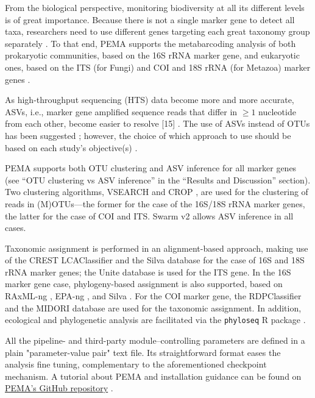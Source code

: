    From the biological perspective, monitoring biodiversity at all its different levels is of great importance. Because there is not a single marker gene to detect all taxa, researchers need to use different genes targeting each great taxonomy group separately \citep{coissac2012bioinformatic}. 
   To that end, PEMA supports the metabarcoding analysis of both prokaryotic communities, based on the 16S rRNA marker gene, and eukaryotic ones, based on the ITS (for Fungi) and COI and 18S rRNA (for Metazoa) marker genes \citep{coissac2012bioinformatic}.
   
   As high-throughput sequencing (HTS) data become more and more accurate, ASVs, i.e., marker gene amplified sequence reads that differ in $≥1$ nucleotide from each other, become easier to resolve [15] \citep{callahan2017exact}. 
   The use of ASVs instead of OTUs has been suggested \citep{callahan2017exact}; 
   however, the choice of which approach to use should be based on each study's objective(s) \citep{pauvert2019bioinformatics}.
   
   PEMA supports both OTU clustering and ASV inference for all marker genes 
   (see “OTU clustering vs ASV inference” in the “Results and Discussion” section). 
   Two clustering algorithms, VSEARCH \citep{rognes2016vsearch} and CROP \citep{hao2011clustering}, are used for the clustering of reads in (M)OTUs—the former for the case of the 16S/18S rRNA marker genes, the latter for the case of COI and ITS. 
   Swarm v2 \citep{mahe2015swarm} allows ASV inference in all cases.
   
   Taxonomic assignment is performed in an alignment-based approach, making use of the CREST LCAClassifier \citep{lanzen2012crest} and the Silva database \citep{quast2012silva} for the case of 16S and 18S rRNA marker genes; 
   the Unite database \citep{rillig2019role} is used for the ITS gene. 
   In the 16S marker gene case, phylogeny-based assignment is also supported, based on RAxML-ng \citep{kozlov2019raxml}, 
   EPA-ng \citep{barbera2019epa}, and Silva \citep{quast2012silva}. 
   For the COI marker gene, the RDPClassifier \citep{wang2007naive} and the MIDORI database \citep{machida2017metazoan} are used for the taxonomic assignment. 
   In addition, ecological and phylogenetic analysis are facilitated via the \texttt{phyloseq} R package \citep{mcmurdie2013phyloseq}.
   
   All the pipeline- and third-party module–controlling parameters are defined in a plain "parameter-value pair" text file. Its straightforward format eases the analysis fine tuning, complementary to the aforementioned checkpoint mechanism. A tutorial about PEMA and installation guidance can be found on \href{https://github.com/hariszaf/pema}{PEMA's GitHub repository} .


